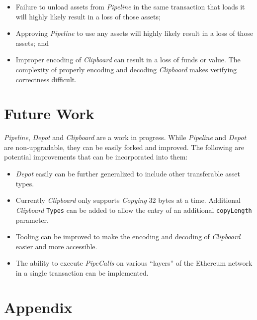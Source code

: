 \documentclass[tikz]{article}
\newcommand{\code}[1]{\texttt{#1}}
\newcommand{\term}[1]{\textsl{#1}}
\begin{document}
\begin{itemize}
    \item Failure to unload assets from \term{Pipeline} in the same transaction that loads it will highly likely result in a loss of those assets;
    \item Approving \term{Pipeline} to use any assets will highly likely result in a loss of those assets; and
    \item Improper encoding of \term{Clipboard} can result in a loss of funds or value. The complexity of properly encoding and decoding \term{Clipboard} makes verifying correctness difficult. 
\end{itemize}

\section{Future Work}
\term{Pipeline}, \term{Depot} and \term{Clipboard} are a work in progress. While \term{Pipeline} and \term{Depot} are non-upgradable, they can be easily forked and improved. The following are potential improvements that can be incorporated into them:

\begin{itemize}
    \item \term{Depot} easily can be further generalized to include other transferable asset types.
    \item Currently \term{Clipboard} only supports \term{Copying} 32 bytes at a time. Additional \term{Clipboard} \code{Types} can be added to allow the entry of an additional \code{copyLength} parameter.
    \item Tooling can be improved to make the encoding and decoding of \term{Clipboard} easier and more accessible.
    \item The ability to execute \term{PipeCalls} on various “layers” of the Ethereum network in a single transaction can be implemented.
\end{itemize}

\newpage
\section{Appendix}

\newpage
\end{document}
